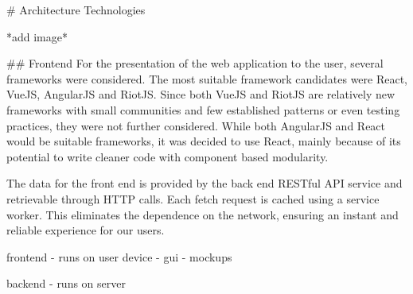 \begin{markdown}


# Architecture Technologies

*add image*

## Frontend
For the presentation of the web application to the user, several frameworks were considered. The most suitable framework candidates were React\cite{React}, VueJS\cite{VueJS}, AngularJS\cite{AngularJS} and RiotJS\cite{RiotJS}. Since both VueJS and RiotJS are relatively new frameworks with small communities and few established patterns or even testing practices, they were not further considered. While both AngularJS and React would be suitable frameworks, it was decided to use React, mainly because of its potential to write cleaner code with component based modularity.

The data for the front end is provided by the back end RESTful API service and retrievable through HTTP calls. Each fetch request is cached using a service worker. This eliminates the dependence on the network, ensuring an instant and reliable experience for our users.




frontend
- runs on user device
- gui
- mockups

backend
- runs on server




\end{markdown}
